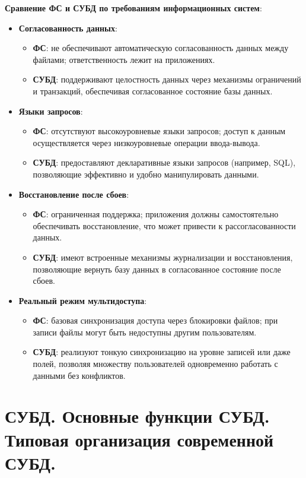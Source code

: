 \documentclass[a4paper,12pt]{article}
\begin{document}
\textbf{Сравнение ФС и СУБД по требованиям информационных систем}:

\begin{itemize}
    \item \textbf{Согласованность данных}:
    \begin{itemize}
        \item \textbf{ФС}: не обеспечивают автоматическую согласованность данных между файлами; ответственность лежит на приложениях.
        \item \textbf{СУБД}: поддерживают целостность данных через механизмы ограничений и транзакций, обеспечивая согласованное состояние базы данных.
    \end{itemize}
    \item \textbf{Языки запросов}:
    \begin{itemize}
        \item \textbf{ФС}: отсутствуют высокоуровневые языки запросов; доступ к данным осуществляется через низкоуровневые операции ввода-вывода.
        \item \textbf{СУБД}: предоставляют декларативные языки запросов (например, SQL), позволяющие эффективно и удобно манипулировать данными.
    \end{itemize}
    \item \textbf{Восстановление после сбоев}:
    \begin{itemize}
        \item \textbf{ФС}: ограниченная поддержка; приложения должны самостоятельно обеспечивать восстановление, что может привести к рассогласованности данных.
        \item \textbf{СУБД}: имеют встроенные механизмы журнализации и восстановления, позволяющие вернуть базу данных в согласованное состояние после сбоев.
    \end{itemize}
    \item \textbf{Реальный режим мультидоступа}:
    \begin{itemize}
        \item \textbf{ФС}: базовая синхронизация доступа через блокировки файлов; при записи файлы могут быть недоступны другим пользователям.
        \item \textbf{СУБД}: реализуют тонкую синхронизацию на уровне записей или даже полей, позволяя множеству пользователей одновременно работать с данными без конфликтов.
    \end{itemize}
\end{itemize}

\section{СУБД. Основные функции СУБД. Типовая организация современной СУБД.}
\end{document}
